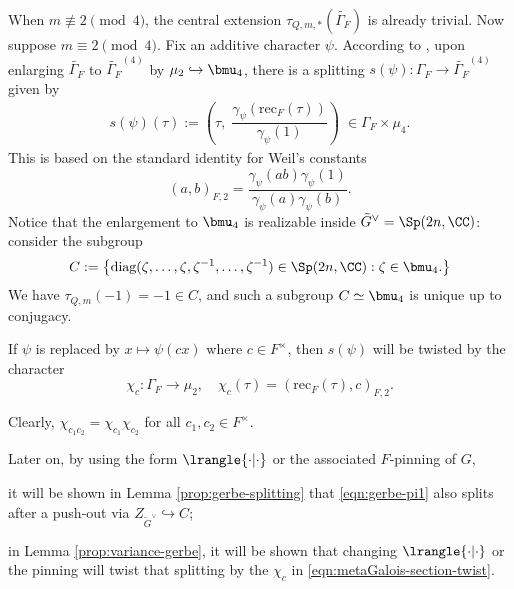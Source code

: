 \documentclass[a4paper,10pt]{article}
\begin{document}
When $m \not\equiv 2 \pmod 4$, the central extension $\tau_{Q,m,*}(\widetilde{\Gamma_F})$ is already trivial. Now suppose $m \equiv 2 \pmod 4$. Fix an additive character $\psi$. According to \cite[Proposition 4.5]{Weis17}, upon enlarging $\widetilde{\Gamma_F}$ to $\widetilde{\Gamma_F}^{(4)}$ by $\mu_2 \hookrightarrow \bmu_4$, there is a splitting $s(\psi): \Gamma_F \to \widetilde{\Gamma_F}^{(4)}$ given by
\begin{gather*}
	s(\psi)(\tau) := \left( \tau, \; \dfrac{ \gamma_\psi(\text{rec}_F(\tau)) }{\gamma_\psi(1)} \right) \; \in \Gamma_F \times \mu_4.
\end{gather*}
This is based on the standard identity \cite[Proposition 1.3.3]{Per81} for Weil's constants
\begin{equation}\label{eqn:Weil-Hilbert}
	(a,b)_{F,2} = \dfrac{\gamma_\psi(ab) \gamma_\psi(1)}{\gamma_\psi(a) \gamma_\psi(b)}.
\end{equation}
Notice that the enlargement to $\bmu_4$ is realizable inside $\tilde{G}^\vee = \Sp(2n, \CC)$: consider the subgroup
\begin{equation}\label{eqn:C}
	C := \left\{ \text{diag}(\zeta, \ldots, \zeta, \zeta^{-1}, \ldots, \zeta^{-1}) \in \Sp(2n, \CC): \zeta \in \bmu_4. \right\}
\end{equation}
We have $\tau_{Q,m}(-1) = -1 \in C$, and such a subgroup $C \simeq \bmu_4$ is unique up to conjugacy.

\begin{lemma}\label{prop:variance-metaGalois}
	If $\psi$ is replaced by $x \mapsto \psi(cx)$ where $c \in F^\times$, then $s(\psi)$ will be twisted by the character
	\begin{equation}\label{eqn:metaGalois-section-twist}
		\chi_c: \Gamma_F \to \mu_2, \quad \chi_c(\tau) = (\mathrm{rec}_F(\tau), c)_{F,2}.
	\end{equation}
\end{lemma}
Clearly, $\chi_{c_1 c_2} = \chi_{c_1} \chi_{c_2}$ for all $c_1, c_2 \in F^\times$.

Later on, by using the form $\lrangle{\cdot|\cdot}$ or the associated $F$-pinning \cite[Exp XXIII]{SGA3-3} of $G$,
\begin{compactitem}
	\item it will be shown in Lemma \ref{prop:gerbe-splitting} that \eqref{eqn:gerbe-pi1} also splits after a push-out via $Z_{\tilde{G}^\vee} \hookrightarrow C$;
	\item in Lemma \ref{prop:variance-gerbe}, it will be shown that changing $\lrangle{\cdot|\cdot}$ or the pinning will twist that splitting by the $\chi_c$ in \eqref{eqn:metaGalois-section-twist}.
\end{compactitem}
\end{document}

